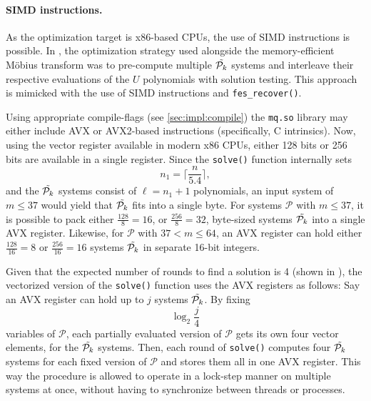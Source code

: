 
\paragraph{SIMD instructions.} As the optimization target is x86-based CPUs, the use of SIMD instructions is possible. In \cite{eurocrypt-2021-30841}, the optimization strategy used alongside the memory-efficient Möbius transform was to pre-compute multiple $\Tilde{\mathcal{P}_k}$ systems and interleave their respective evaluations of the $U$ polynomials with solution testing. This approach is mimicked with the use of SIMD instructions and \texttt{fes\_recover()}.

Using appropriate compile-flags (see \cref{sec:impl:compile}) the \texttt{mq.so} library may either include AVX or AVX2-based instructions (specifically, C intrinsics). Now, using the vector register available in modern x86 CPUs, either 128 bits or 256 bits are available in a single register. Since the \texttt{solve()} function internally sets 
$$
    n_1 = \lceil \frac{n}{5.4}\rceil,
$$
and the $\Tilde{\mathcal{P}_k}$ systems consist of $\ell = n_1 + 1$ polynomials, an input system of $m \leq 37$ would yield that $\Tilde{\mathcal{P}_k}$ fits into a single byte. For systems $\mathcal{P}$ with $m \leq 37$, it is possible to pack either $\frac{128}{8} = 16$, or $ \frac{256}{8} = 32$, byte-sized systems $\Tilde{\mathcal{P}_k}$ into a single AVX register. Likewise, for $\mathcal{P}$ with $37 < m \leq 64$, an AVX register can hold either $\frac{128}{16} = 8$ or $\frac{256}{16} = 16$ systems $\Tilde{\mathcal{P}_k}$ in separate 16-bit integers. 

Given that the expected number of rounds to find a solution is 4 (shown in \cite{eurocrypt-2021-30841}), the vectorized version of the \texttt{solve()} function uses the AVX registers as follows: Say an AVX register can hold up to $j$ systems $\Tilde{\mathcal{P}_k}$. By fixing 
$$
    \log_2 \frac{j}{4}
$$ 
variables of $\mathcal{P}$, each partially evaluated version of $\mathcal{P}$ gets its own four vector elements, for the $\Tilde{\mathcal{P}_k}$ systems. Then, each round of \texttt{solve()} computes four $\Tilde{\mathcal{P}_k}$ systems for each fixed version of $\mathcal{P}$ and stores them all in one AVX register. This way the procedure is allowed to operate in a lock-step manner on multiple systems at once, without having to synchronize between threads or processes. 

